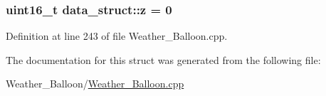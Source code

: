 \subsubsection[{\texorpdfstring{z}{z}}]{\setlength{\rightskip}{0pt plus 5cm}uint16\+\_\+t data\+\_\+struct\+::z = 0}\hypertarget{structdata__struct_a57bb6a98c0a24ff59ef2decf0d51b611}{}\label{structdata__struct_a57bb6a98c0a24ff59ef2decf0d51b611}


Definition at line 243 of file Weather\+\_\+\+Balloon.\+cpp.



The documentation for this struct was generated from the following file\+:\begin{DoxyCompactItemize}
\item 
Weather\+\_\+\+Balloon/\hyperlink{_weather___balloon_8cpp}{Weather\+\_\+\+Balloon.\+cpp}\end{DoxyCompactItemize}
